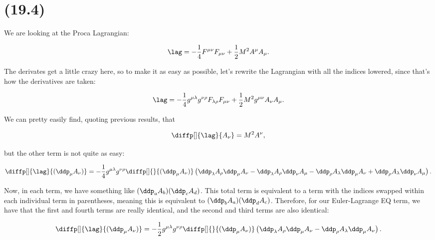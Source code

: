 \section{(19.4)}

We are looking at the Proca Lagrangian:

\begin{equation}
    \lag = -\frac{1}{4}F^{\mu\nu}F_{\mu\nu} + \frac{1}{2}M^2A^{\mu}A_{\mu}.
\end{equation}


\begin{parts}

\item The derivates get a little crazy here, so to make it as easy as possible, let's rewrite the Lagrangian with all the indices lowered, since that's how the derivatives are taken:

\begin{equation*}
    \lag = -\frac{1}{4}g^{\mu\lambda}g^{\nu\rho}F_{\lambda\rho}F_{\mu\nu} + \frac{1}{2}M^2 g^{\mu\nu}A_{\nu}A_{\mu}.
\end{equation*}

We can pretty easily find, quoting previous results, that

\begin{equation*}
    \diffp[]{\lag}{A_{\nu}} = M^2A^{\nu},
\end{equation*}

but the other term is not quite as easy:

\newcommand{\FMUNUPROD}[4]{\ddp_{#1}A_{#2}\ddp_{#3}A_{#4}}
\newcommand{\FMUNU}[2]{\ddp_{#1}A_{#2}}
\begin{equation*}
    \diffp[]{\lag}{(\ddp_{\mu}A_{\nu})} = -\frac{1}{4}g^{\mu\lambda}g^{\nu\rho} \diffp[]{}{(\ddp_{\mu}A_{\nu})} \left( \FMUNUPROD{\lambda}{\rho}{\mu}{\nu} - \FMUNUPROD{\lambda}{\rho}{\nu}{\mu} - \FMUNUPROD{\rho}{\lambda}{\mu}{\nu} + \FMUNUPROD{\rho}{\lambda}{\nu}{\mu} \right).
\end{equation*}

Now, in each term, we have something like $(\ddp_aA_b)(\ddp_cA_d)$. This total term is equivalent to a term with the indices swapped within each individual term in parentheses, meaning this is equivalent to $(\ddp_bA_a)(\ddp_dA_c)$. Therefore, for our Euler-Lagrange EQ term, we have that the first and fourth terms are really identical, and the second and third terms are also identical:

\begin{equation*}
    \diffp[]{\lag}{(\ddp_{\mu}A_{\nu})} = -\frac{1}{2}g^{\mu\lambda}g^{\nu\rho} \diffp[]{}{(\ddp_{\mu}A_{\nu})} \left( \FMUNUPROD{\lambda}{\rho}{\mu}{\nu} - \FMUNUPROD{\rho}{\lambda}{\mu}{\nu} \right).
\end{equation*}


\end{parts}
